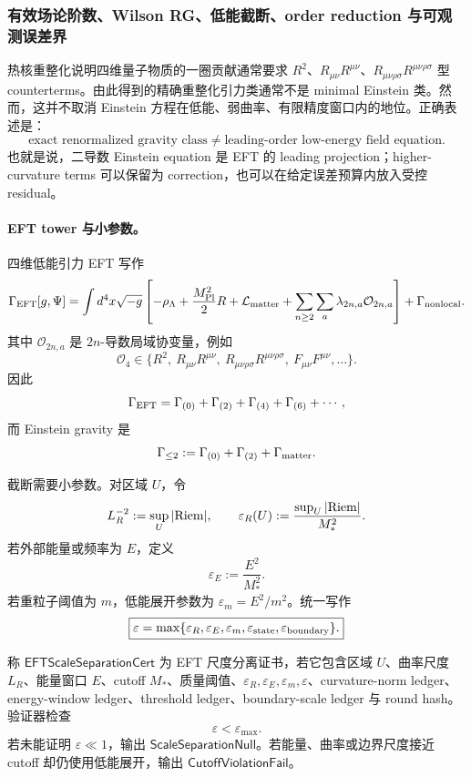 \subsubsection{有效场论阶数、Wilson RG、低能截断、order reduction 与可观测误差界}\label{subsubsec:typed-address-biaxial-completion-eft-truncation-wilson-rg-observable-error}
热核重整化说明四维量子物质的一圈贡献通常要求 \(R^2\)、\(R_{\mu\nu}R^{\mu\nu}\)、\(R_{\mu\nu\rho\sigma}R^{\mu\nu\rho\sigma}\) 型 counterterms。由此得到的精确重整化引力类通常不是 minimal Einstein 类。然而，这并不取消 Einstein 方程在低能、弱曲率、有限精度窗口内的地位。正确表述是：
\[
\boxed{
\text{exact renormalized gravity class}
\ne
\text{leading-order low-energy field equation}.
}
\]
也就是说，二导数 Einstein equation 是 EFT 的 leading projection；higher-curvature terms 可以保留为 correction，也可以在给定误差预算内放入受控 residual。

\paragraph{EFT tower 与小参数。}
四维低能引力 EFT 写作
\[
\Gamma_{\rm EFT}[g,\Psi]
=
\int d^4x\sqrt{-g}
\left[
-\rho_\Lambda
+
\frac{M_{\rm Pl}^2}{2}R
+
\mathcal L_{\rm matter}
+
\sum_{n\ge2}\sum_a\lambda_{2n,a}\mathcal O_{2n,a}
\right]
+
\Gamma_{\rm nonlocal}.
\]
其中 \(\mathcal O_{2n,a}\) 是 \(2n\)-导数局域协变量，例如
\[
\mathcal O_4\in
\{R^2,\ R_{\mu\nu}R^{\mu\nu},\ R_{\mu\nu\rho\sigma}R^{\mu\nu\rho\sigma},\ F_{\mu\nu}F^{\mu\nu},\ldots\}.
\]
因此
\[
\Gamma_{\rm EFT}
=
\Gamma_{(0)}+\Gamma_{(2)}+\Gamma_{(4)}+\Gamma_{(6)}+\cdots,
\]
而 Einstein gravity 是
\[
\Gamma_{\le2}:=\Gamma_{(0)}+\Gamma_{(2)}+\Gamma_{\rm matter}.
\]

截断需要小参数。对区域 \(U\)，令
\[
L_R^{-2}:=\sup_U|{\rm Riem}|,
\qquad
\varepsilon_R(U):=\frac{\sup_U|{\rm Riem}|}{M_*^2}.
\]
若外部能量或频率为 \(E\)，定义
\[
\varepsilon_E:=\frac{E^2}{M_*^2}.
\]
若重粒子阈值为 \(m\)，低能展开参数为 \(\varepsilon_m=E^2/m^2\)。统一写作
\[
\boxed{
\varepsilon
=
\max\{\varepsilon_R,\varepsilon_E,\varepsilon_m,\varepsilon_{\rm state},\varepsilon_{\rm boundary}\}.
}
\]

\begin{definition}\label{def:typed-address-biaxial-completion-eft-scale-separation-cert}
称 \(\mathsf{EFTScaleSeparationCert}\) 为 EFT 尺度分离证书，若它包含区域 \(U\)、曲率尺度 \(L_R\)、能量窗口 \(E\)、cutoff \(M_*\)、质量阈值、\(\varepsilon_R,\varepsilon_E,\varepsilon_m,\varepsilon\)、curvature-norm ledger、energy-window ledger、threshold ledger、boundary-scale ledger 与 round hash。验证器检查
\[
\varepsilon<\varepsilon_{\max}.
\]
若未能证明 \(\varepsilon\ll1\)，输出 \(\mathsf{ScaleSeparationNull}\)。若能量、曲率或边界尺度接近 cutoff 却仍使用低能展开，输出 \(\mathsf{CutoffViolationFail}\)。
\end{definition}

